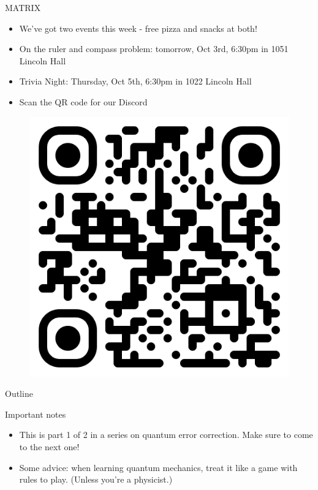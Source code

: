 \documentclass[aspectratio=169]{beamer}
\begin{document}
\begin{frame}{MATRIX}
    \begin{itemize}
        \item We've got two events this week - free pizza and snacks at both!
        \item On the ruler and compass problem: tomorrow, Oct 3rd, 6:30pm in 1051 Lincoln Hall
        \item Trivia Night: Thursday, Oct 5th, 6:30pm in 1022 Lincoln Hall
        \item Scan the QR code for our Discord
    \end{itemize}
    \begin{figure}[h]
        \centering
        \includegraphics[scale=0.15]{qrcode.png}
    \end{figure}
\end{frame}
\begin{frame}{Outline}
  \tableofcontents
\end{frame}

\begin{frame}{Important notes}
  \begin{itemize}
    \item This is part 1 of 2 in a series on quantum error correction. Make sure to come to the next one!
    \item Some advice: when learning quantum mechanics, treat it like a game with rules to play. (Unless you're a physicist.)
  \end{itemize}
\end{frame}
\end{document}
